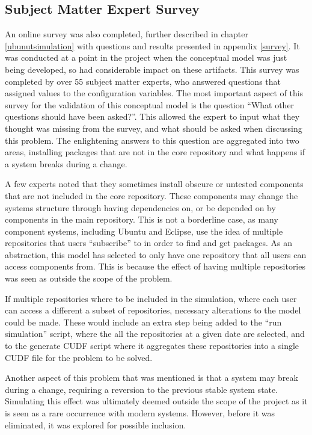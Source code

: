 \subsection{Subject Matter Expert Survey}
An online survey was also completed, further described in chapter \ref{ubunutsimulation} with questions and results presented in appendix \ref{survey}.
It was conducted at a point in the project when the conceptual model was just being developed, so had considerable impact on these artifacts.
This survey was completed by over 55 subject matter experts, who answered questions that assigned values to the configuration variables.
The most important aspect of this survey for the validation of this conceptual model is the question ``What other questions should have been asked?''.
This allowed the expert to input what they thought was missing from the survey, and what should be asked when discussing this problem.
The enlightening answers to this question are aggregated into two areas, installing packages that are not in the core repository and what happens if a system breaks during a change.

A few experts noted that they sometimes install obscure or untested components that are not included in the core repository.
These components may change the systems structure through having dependencies on, or be depended on by components in the main repository.
This is not a borderline case, as many component systems, including Ubuntu and Eclipse, use the idea of multiple repositories that users ``subscribe'' to in order to find and get packages.
As an abstraction, this model has selected to only have one repository that all users can access components from.
This is because the effect of having multiple repositories was seen as outside the scope of the problem.

If multiple repositories where to be included in the simulation, where each user can access a different a subset of repositories, necessary alterations to the model could be made.
These would include an extra step being added to the ``run simulation'' script, where the all the repositories at a given date are selected, and to the generate CUDF script where
it aggregates these repositories into a single CUDF file for the problem to be solved.

Another aspect of this problem that was mentioned is that a system may break during a change, requiring a reversion to the previous stable system state.
Simulating this effect was ultimately deemed outside the scope of the project as it is seen as a rare occurrence with modern systems.
However, before it was eliminated, it was explored for possible inclusion.

